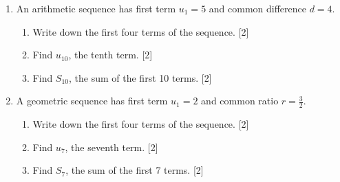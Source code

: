 \documentclass[12pt, twoside]{article}
\begin{document}
\begin{enumerate}[itemsep=0.5cm]
\newpage
\item An arithmetic sequence has first term $u_1=5$ and common difference $d=4$.
    \begin{enumerate}[itemsep=0.25cm]
        \item Write down the first four terms of the sequence. \hfill [2]
        \item Find $u_{10}$, the tenth term. \hfill [2]
        \item Find $S_{10}$, the sum of the first 10 terms. \hfill [2]
    \end{enumerate}

\newpage
\item A geometric sequence has first term $u_1=2$ and common ratio $\displaystyle r=\frac{3}{2}$.
    \begin{enumerate}[itemsep=0.25cm]
        \item Write down the first four terms of the sequence. \hfill [2]
        \item Find $u_7$, the seventh term. \hfill [2]
        \item Find $S_7$, the sum of the first 7 terms. \hfill [2]
    \end{enumerate}

\end{enumerate}
\end{document}
